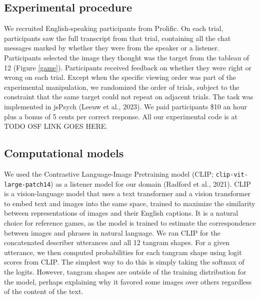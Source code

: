 \documentclass[10pt, letterpaper]{article}
\begin{document}
\subsection{Experimental procedure}\label{experimental-procedure}

We recruited English-speaking participants from Prolific. On each trial,
participants saw the full transcript from that trial, containing all the
chat messages marked by whether they were from the speaker or a
listener. Participants selected the image they thought was the target
from the tableau of 12 (Figure \ref{game}). Participants received
feedback on whether they were right or wrong on each trial. Except when
the specific viewing order was part of the experimental manipulation, we
randomized the order of trials, subject to the constraint that the same
target could not repeat on adjacent trials. The task was implemented in
jsPsych (Leeuw et al., 2023). We paid participants \$10 an hour plus a
bonus of 5 cents per correct response. All our experimental code is at
TODO OSF LINK GOES HERE.

\subsection{Computational models}\label{computational-models}

We used the Contrastive Language-Image Pretraining model (CLIP;
\texttt{clip-vit-large-patch14}) as a listener model for our domain
(Radford et al., 2021). CLIP is a vision-language model that uses a text
transformer and a vision transformer to embed text and images into the
same space, trained to maximize the similarity between representations
of images and their English captions. It is a natural choice for
reference games, as the model is trained to estimate the correspondence
between images and phrases in natural language. We ran CLIP for the
concatenated describer utterances and all 12 tangram shapes. For a given
utterance, we then computed probabilities for each tangram shape using
logit scores from CLIP. The simplest way to do this is simply taking the
softmax of the logits. However, tangram shapes are outside of the
training distribution for the model, perhaps explaining why it favored
some images over others regardless of the content of the text.
\end{document}

